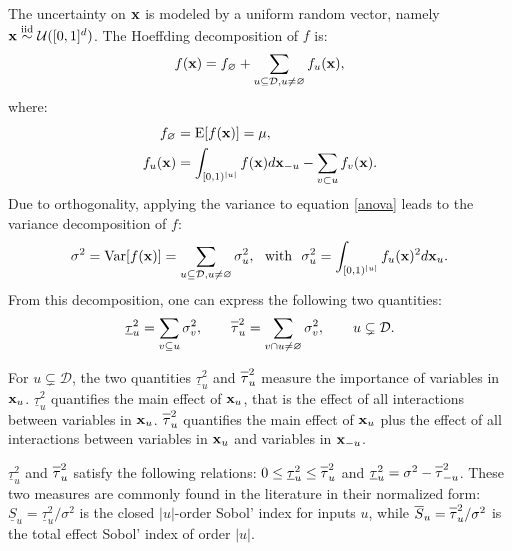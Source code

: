 The uncertainty on $\boldsymbol{\mathbf{x}}$ is modeled by a uniform random vector, namely $\boldsymbol{\mathbf{x}} \stackrel{{\rm iid}}{\sim} \mathcal{U}([0,1]^d)$. The Hoeffding decomposition \cite{Hoeffding,Sobol'} of $f$ is:
\begin{equation}
f(\boldsymbol{\mathbf{x}})=f_{\varnothing}+\sum \limits_{u \subseteq \mathcal{D}, u \neq \varnothing} f_u(\boldsymbol{\mathbf{x}}),
\label{anova}
\end{equation}
where:
\begin{align*}
f_{\varnothing} &= \mathrm{E}[f(\boldsymbol{\mathbf{x}})]= \mu, \\
f_u(\boldsymbol{\mathbf{x}}) &= \int_{[0,1)^{|u|}} f(\boldsymbol{\mathbf{x}}) d{\boldsymbol{\mathbf{x}}}_{-u} - \sum \limits_{v \subset u} f_v(\boldsymbol{\mathbf{x}}).
\end{align*}
Due to orthogonality, applying the variance to equation \eqref{anova} leads to the variance decomposition of $f$:
\[ \sigma^2 = \mathrm{Var}[f(\vx)] = \sum \limits_{u \subseteq \mathcal{D}, u \neq \varnothing} \sigma_u^2, \ \text{ with } \ \sigma_u^2=\int_{[0,1)^{|u|}} f_u(\vx)^2 d{\vx_u}.\]
From this decomposition, one can express the following two quantities:
\[\underline{\tau}_u^2 = \sum \limits_{v \subseteq u} \sigma_v^2, \qquad
\ov{$\tau$}_u^2 = \sum \limits_{v \cap u \neq \varnothing} \sigma_v^2, \qquad u \subsetneq \mathcal{D}.\]

For $u \subsetneq \mathcal{D}$, the two quantities $\underline{\tau}_u^2$ and $\ov{$\tau$}_u^2$ measure the importance of variables in $\boldsymbol{\mathbf{x}}_u$. $\underline{\tau}_u^2$ quantifies the main effect of $\boldsymbol{\mathbf{x}}_u$, that is the effect of all interactions between variables in $\boldsymbol{\mathbf{x}}_u$. $\ov{$\tau$}_u^2$ quantifies the main effect of $\boldsymbol{\mathbf{x}}_u$ plus the effect of all interactions between variables in $\boldsymbol{\mathbf{x}}_u$ and variables in $\boldsymbol{\mathbf{x}}_{-u}$.

$\underline{\tau}_u^2$ and $\ov{$\tau$}_u^2$ satisfy the following relations: $ 0 \leq  \underline{\tau}_u^2 \leq \ov{$\tau$}_u^2$ and $\underline{\tau}_u^2 = \sigma^2 - \ov{$\tau$}_{-u}^2$. These two measures are commonly found in the literature in their normalized form: $\underline{S}_u = \underline{\tau}_u^2 / \sigma^2$ is the closed $|u|$-order Sobol' index for inputs $u$, while $\ov{$S$}_u = \ov{$\tau$}_u^2 / \sigma^2$ is the total effect Sobol' index of order $|u|$.
\bigskip

